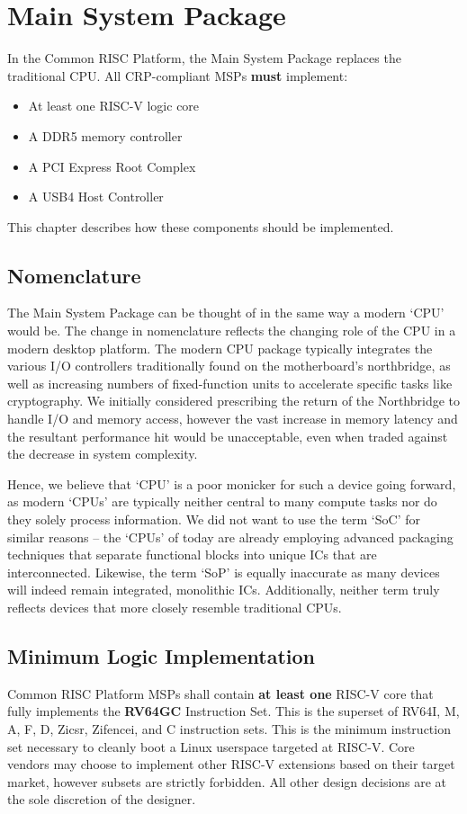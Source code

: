 \documentclass[12pt]{report}
\begin{document}
\chapter{Main System Package}
\large
In the Common RISC Platform, the Main System Package replaces the traditional CPU. All CRP-compliant MSPs \textbf{must}
implement:
\begin{itemize}
	\item At least one RISC-V logic core
	\item A DDR5 memory controller
	\item A PCI Express Root Complex
	\item A USB4 Host Controller
\end{itemize}
This chapter describes how these components should be implemented.
\normalsize
\newpage

\section{Nomenclature}
The Main System Package can be thought of in the same way a modern `CPU' would be. The change in nomenclature reflects the
changing role of the CPU in a modern desktop platform. The modern CPU package typically integrates the various I/O controllers
traditionally found on the motherboard's northbridge, as well as increasing numbers of fixed-function units to accelerate
specific tasks like cryptography. We initially considered prescribing the return of the Northbridge to handle I/O and memory
access, however the vast increase in memory latency and the resultant performance hit would be unacceptable, even when
traded against the decrease in system complexity.

Hence, we believe that `CPU' is a poor monicker for such a device going forward, as modern `CPUs' are typically neither
central to many compute tasks nor do they solely process information. We did not want to use the term `SoC' for similar
reasons -- the `CPUs' of today are already employing advanced packaging techniques that separate functional blocks into
unique ICs that are interconnected. Likewise, the term `SoP' is equally inaccurate as many devices will indeed remain
integrated, monolithic ICs. Additionally, neither term truly reflects devices that more closely resemble traditional CPUs.

\section{Minimum Logic Implementation}
Common RISC Platform MSPs shall contain \textbf{at least one} RISC-V core that fully implements the \textbf{RV64GC} Instruction
Set. This is the superset of RV64I, M, A, F, D, Zicsr, Zifencei, and C instruction sets. This is the minimum instruction
set necessary to cleanly boot a Linux userspace targeted at RISC-V. Core vendors may choose to implement other RISC-V
extensions based on their target market, however subsets are strictly forbidden. All other design decisions are at the
sole discretion of the designer.
\end{document}
